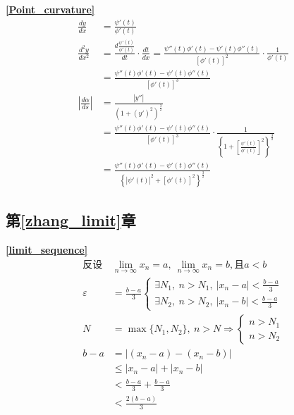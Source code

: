 \textbf{\large \ref{Point_curvature}}
\begin{align*}
    \frac{dy}{dx}&=\frac{\psi'(t)}{\phi'(t)}\\
    \frac{d^2y}{dx^2}&=\frac{d\frac{\psi'(t)}{\phi'(t)}}{dt}\cdot\frac{dt}{dx}
=\frac{\psi''(t)\phi'(t)-\psi'(t)\phi''(t)}{\left[\phi'(t)\right]^2}\cdot\frac{1}{\phi'(t)}\\
&=\frac{\psi''(t)\phi'(t)-\psi'(t)\phi''(t)}{\left[\phi'(t)\right]^3}\\
    \left|\frac{d\alpha}{ds}\right|&=\frac{\left|y''\right|}{\left(1+(y')^2\right)^{\frac{3}{2}}}\\
    &=\frac{\psi''(t)\phi'(t)-\psi'(t)\phi''(t)}{\left[\phi'(t)\right]^3}\cdot\frac{1}{\left\{1+\left[\frac{\psi'(t)}{\phi'(t)}\right]^2\right\}^{\frac{3}{2}}}\\
    &=\frac{\psi''(t)\phi'(t)-\psi'(t)\phi''(t)}{\left\{\left|\psi'(t)\right|^2+\left[\phi'(t)\right]^2\right\}^{\frac{3}{2}}}
\end{align*}

\subsection{\centering 第\ref{zhang_limit}章}
\textbf{\large \ref{limit_sequence}}
\begin{displaymath}
    \begin{split}
        \mbox{反设}&\lim\limits_{n \to \infty}x_n =a,\ \lim\limits_{n \to \infty}x_n =b,\mbox{且}a<b\\
        \varepsilon&=\frac{b-a}{3}\begin{cases}
            \exists N_1,\ n>N_1,\ \left|x_n-a\right|<\frac{b-a}{3}\\
            \exists N_2,\ n>N_2,\ \left|x_n-b\right|<\frac{b-a}{3}
        \end{cases}\\
        N&=\max\{N_1,N_2\},\ n>N\Rightarrow\begin{cases}
            n>N_1\\
            n>N_2
        \end{cases}\\
        b-a&=\left|(x_n-a)-(x_n-b)\right|\\
        &\leqslant \left|x_n-a\right|+\left|x_n-b\right|\\
        &<\frac{b-a}{3}+\frac{b-a}{3}\\
        &<\frac{2(b-a)}{3}
    \end{split}
\end{displaymath}

